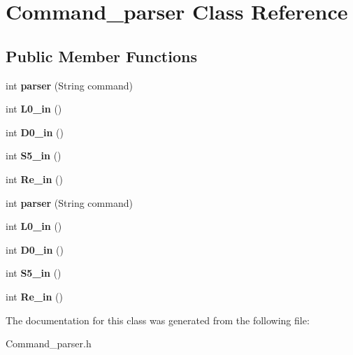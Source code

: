 \hypertarget{classCommand__parser}{}\section{Command\+\_\+parser Class Reference}
\label{classCommand__parser}
\subsection*{Public Member Functions}
\begin{DoxyCompactItemize}
\item 
int {\bfseries parser} (String command)\hypertarget{classCommand__parser_a824a810c20d63e195d878893770fcf54}{}\label{classCommand__parser_a824a810c20d63e195d878893770fcf54}

\item 
int {\bfseries L0\+\_\+in} ()\hypertarget{classCommand__parser_a9d27cdfe6b2272e7816db08e28b35860}{}\label{classCommand__parser_a9d27cdfe6b2272e7816db08e28b35860}

\item 
int {\bfseries D0\+\_\+in} ()\hypertarget{classCommand__parser_aa27cd4b20aa40afa2c2e3c11bd64c40c}{}\label{classCommand__parser_aa27cd4b20aa40afa2c2e3c11bd64c40c}

\item 
int {\bfseries S5\+\_\+in} ()\hypertarget{classCommand__parser_a1e79ee263020d9ce89625fee4077db2e}{}\label{classCommand__parser_a1e79ee263020d9ce89625fee4077db2e}

\item 
int {\bfseries Re\+\_\+in} ()\hypertarget{classCommand__parser_a351577d29ec86f81fc50eabffbf4657c}{}\label{classCommand__parser_a351577d29ec86f81fc50eabffbf4657c}

\item 
int {\bfseries parser} (String command)\hypertarget{classCommand__parser_a824a810c20d63e195d878893770fcf54}{}\label{classCommand__parser_a824a810c20d63e195d878893770fcf54}

\item 
int {\bfseries L0\+\_\+in} ()\hypertarget{classCommand__parser_a9d27cdfe6b2272e7816db08e28b35860}{}\label{classCommand__parser_a9d27cdfe6b2272e7816db08e28b35860}

\item 
int {\bfseries D0\+\_\+in} ()\hypertarget{classCommand__parser_aa27cd4b20aa40afa2c2e3c11bd64c40c}{}\label{classCommand__parser_aa27cd4b20aa40afa2c2e3c11bd64c40c}

\item 
int {\bfseries S5\+\_\+in} ()\hypertarget{classCommand__parser_a1e79ee263020d9ce89625fee4077db2e}{}\label{classCommand__parser_a1e79ee263020d9ce89625fee4077db2e}

\item 
int {\bfseries Re\+\_\+in} ()\hypertarget{classCommand__parser_a351577d29ec86f81fc50eabffbf4657c}{}\label{classCommand__parser_a351577d29ec86f81fc50eabffbf4657c}

\end{DoxyCompactItemize}


The documentation for this class was generated from the following file\+:\begin{DoxyCompactItemize}
\item 
Command\+\_\+parser.\+h\end{DoxyCompactItemize}
